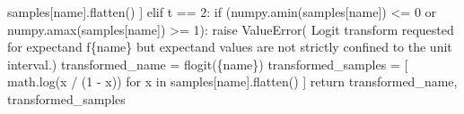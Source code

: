 \documentclass[
  letterpaper,
  DIV=11,
  numbers=noendperiod]{scrartcl}
\newenvironment{Shaded}{\begin{snugshade}}{\end{snugshade}}
\newcommand{\ControlFlowTok}[1]{\textcolor[rgb]{0.00,0.23,0.31}{#1}}
\newcommand{\DecValTok}[1]{\textcolor[rgb]{0.68,0.00,0.00}{#1}}
\newcommand{\KeywordTok}[1]{\textcolor[rgb]{0.00,0.23,0.31}{#1}}
\newcommand{\NormalTok}[1]{\textcolor[rgb]{0.00,0.23,0.31}{#1}}
\newcommand{\OperatorTok}[1]{\textcolor[rgb]{0.37,0.37,0.37}{#1}}
\newcommand{\PreprocessorTok}[1]{\textcolor[rgb]{0.68,0.00,0.00}{#1}}
\newcommand{\SpecialCharTok}[1]{\textcolor[rgb]{0.37,0.37,0.37}{#1}}
\newcommand{\SpecialStringTok}[1]{\textcolor[rgb]{0.13,0.47,0.30}{#1}}
\newcommand{\StringTok}[1]{\textcolor[rgb]{0.13,0.47,0.30}{#1}}
\begin{document}
\begin{Shaded}
\begin{Highlighting}[]
\NormalTok{                            samples[name].flatten() ]}
  \ControlFlowTok{elif}\NormalTok{ t }\OperatorTok{==} \DecValTok{2}\NormalTok{:}
    \ControlFlowTok{if}\NormalTok{ (numpy.amin(samples[name]) }\OperatorTok{\textless{}=} \DecValTok{0} \KeywordTok{or}
\NormalTok{          numpy.amax(samples[name]) }\OperatorTok{\textgreater{}=} \DecValTok{1}\NormalTok{):}
      \ControlFlowTok{raise} \PreprocessorTok{ValueError}\NormalTok{( }\StringTok{\textquotesingle{}Logit transform requested for expectand \textquotesingle{}}
                       \SpecialStringTok{f\textquotesingle{}}\SpecialCharTok{\{}\NormalTok{name}\SpecialCharTok{\}}\SpecialStringTok{ but expectand values are not strictly \textquotesingle{}}
                        \StringTok{\textquotesingle{}confined to the unit interval.\textquotesingle{}}\NormalTok{)}
\NormalTok{    transformed\_name }\OperatorTok{=} \SpecialStringTok{f\textquotesingle{}logit(}\SpecialCharTok{\{}\NormalTok{name}\SpecialCharTok{\}}\SpecialStringTok{)\textquotesingle{}}
\NormalTok{    transformed\_samples }\OperatorTok{=}\NormalTok{ [ math.log(x }\OperatorTok{/}\NormalTok{ (}\DecValTok{1} \OperatorTok{{-}}\NormalTok{ x)) }\ControlFlowTok{for}\NormalTok{ x }\KeywordTok{in}
\NormalTok{                            samples[name].flatten() ]}
  \ControlFlowTok{return}\NormalTok{ transformed\_name, transformed\_samples}
\end{Highlighting}
\end{Shaded}
\end{document}

